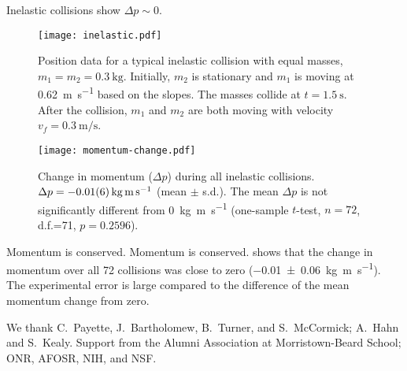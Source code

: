 \documentclass[pdf,serif]{beamer}
\begin{document}
\begin{frame}{}
\begin{columns}[T,totalwidth=\textwidth]
\begin{column}{14.33in}
\begin{minipage}[t][\textheight]{\linewidth}
\begin{block}{Inelastic collisions show $\Delta p\sim 0$.}
\begin{figure}
\begin{center}
\texttt{[image: inelastic.pdf]}
\end{center}
\caption{Position data for a typical inelastic collision with equal masses, $m_1=m_2=\SI{0.3}{\kilo\gram}$. Initially, $m_2$ is stationary and $m_1$ is moving at \SI{0.62}{\meter\per\second} based on the slopes. The masses collide at $t=\SI{1.5}{\second}$. After the collision, $m_1$ and $m_2$ are both moving with velocity $v_f=\SI{0.3}{\meter\per\second}$. }
\label{fig:results1}
\end{figure}
\begin{figure}
\begin{center}
\texttt{[image: momentum-change.pdf]}
\end{center}
\caption{Change in momentum ($\Delta p$) during all inelastic collisions. $\Delta p = \SI{-0.01\pm0.06}{\kilo\gram\meter\per\second}$ (mean $\pm$ s.d.). The mean $\Delta p$ is not significantly different from \SI{0}{\kilo\gram\meter\per\second} (one-sample $t$-test, $n=72$, d.f.=71, $p=0.2596$).}
\label{fig:results2}
\end{figure}
\end{block}
\vfill
\begin{block}{Momentum is conserved.}
Momentum is conserved.  shows that the change in momentum over all 72 collisions was close to zero (\SI{-0.01\pm0.06}{\kilo\gram\meter\per\second}). The experimental error is large compared to the difference of the mean momentum change from zero.
\end{block}
\vspace{1.25in}
\begin{block}{} %
We thank C.~Payette, J.~Bartholomew, B.~Turner, and S.~McCormick; A.~Hahn and S.~Kealy. Support from the Alumni Association at Morristown-Beard School; ONR, AFOSR, NIH, and NSF.
\end{block}
\vfill*
\end{minipage}
\end{column}
\end{columns}
\end{frame}
\end{document}
